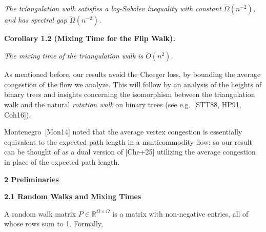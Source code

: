 \documentclass[10pt,a4paper]{article}
\begin{document}
\emph{The triangulation walk satisfies a log-Sobolev inequality with constant $\widetilde{\Omega}(n^{-2})$, and has spectral gap $\widetilde{\Omega}(n^{-2})$.}\par








\par\medskip\noindent\textbf{\textbf{Corollary 1.2}\textbf{ }(Mixing Time for the Flip Walk)\textbf{.}}\par



\emph{The mixing time of the triangulation walk is $\widetilde{O}(n^{2})$.}\par






As mentioned before, our results avoid the Cheeger loss, by bounding the average congestion of the flow we analyze. This will follow by an analysis of the heights of binary trees and insights concerning the isomorphism between the triangulation walk and the natural \emph{rotation walk} on binary trees (see e.g. [STT88, HP91, Coh16]).\par




Montenegro [Mon14] noted that the average vertex congestion is essentially equivalent to the expected path length in a multicommodity flow; so our result can be thought of as a dual version of [Che+25] utilizing the average congestion in place of the expected path length.\par






\par\medskip\noindent\textbf{2 Preliminaries}\par




\par\medskip\noindent\textbf{2.1 Random Walks and Mixing Times}\par




A random walk matrix $P\in\mathbb{R}^{\Omega\times\Omega}$ is a matrix with non-negative entries, all of whose rows sum to 1. Formally,\par
\end{document}
